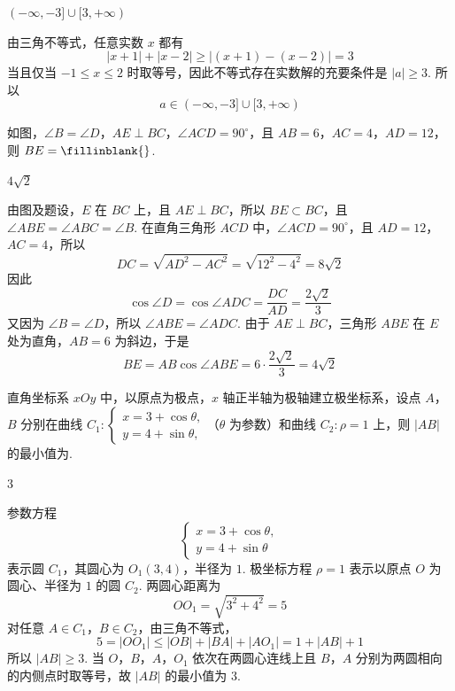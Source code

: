 \begin{answer}
\((-\infty,-3]\cup[3,+\infty)\)
\end{answer}

\begin{solution}
由三角不等式，任意实数 \(x\) 都有
\[
|x+1|+|x-2|\geqslant|(x+1)-(x-2)|=3
\]
当且仅当 \(-1\leqslant x\leqslant2\) 时取等号，因此不等式存在实数解的充要条件是 \(|a|\geqslant3\). 所以
\[
a\in(-\infty,-3]\cup[3,+\infty)
\]
\end{solution}

\begin{problem}
如图，\(\angle B = \angle D\)，\(AE \perp BC\)，\(\angle ACD = 90^{\circ}\)，且 \(AB = 6\)，\(AC = 4\)，\(AD = 12\)，则 \(BE =\fillinblank{}\).

\end{problem}

\begin{answer}
\(4\sqrt{2}\)
\end{answer}

\begin{solution}
由图及题设，\(E\) 在 \(BC\) 上，且 \(AE\perp BC\)，所以 \(BE\subset BC\)，且 \(\angle ABE=\angle ABC=\angle B\). 在直角三角形 \(ACD\) 中，\(\angle ACD=90^\circ\)，且 \(AD=12\)，\(AC=4\)，所以
\[
DC=\sqrt{AD^2-AC^2}=\sqrt{12^2-4^2}=8\sqrt{2}
\]
因此
\[
\cos\angle D=\cos\angle ADC=\frac{DC}{AD}=\frac{2\sqrt{2}}{3}
\]
又因为 \(\angle B=\angle D\)，所以 \(\angle ABE=\angle ADC\). 由于 \(AE\perp BC\)，三角形 \(ABE\) 在 \(E\) 处为直角，\(AB=6\) 为斜边，于是
\[
BE=AB\cos\angle ABE=6\cdot\frac{2\sqrt{2}}{3}=4\sqrt{2}
\]
\end{solution}

\begin{problem}
直角坐标系 \(xOy\) 中，以原点为极点，\(x\) 轴正半轴为极轴建立极坐标系，设点 \(A\)，\(B\) 分别在曲线 \( C_{1}:\begin{cases}
x=3+\cos\theta,\\
y=4+\sin\theta,
\end{cases} \)（\(\theta\) 为参数）和曲线 \( C_{2}:\rho=1 \) 上，则 \( |AB| \) 的最小值为\fillinblank{}.
\end{problem}

\begin{answer}
3
\end{answer}

\begin{solution}
参数方程
\[
\begin{cases}
x=3+\cos\theta,\\
y=4+\sin\theta
\end{cases}
\]
表示圆 \(C_1\)，其圆心为 \(O_1(3,4)\)，半径为 \(1\). 极坐标方程 \(\rho=1\) 表示以原点 \(O\) 为圆心、半径为 \(1\) 的圆 \(C_2\). 两圆心距离为
\[
OO_1=\sqrt{3^2+4^2}=5
\]
对任意 \(A\in C_1\)，\(B\in C_2\)，由三角不等式，
\[
5=|OO_1|\leqslant|OB|+|BA|+|AO_1|=1+|AB|+1
\]
所以 \(|AB|\geqslant3\). 当 \(O\)，\(B\)，\(A\)，\(O_1\) 依次在两圆心连线上且 \(B\)，\(A\) 分别为两圆相向的内侧点时取等号，故 \(|AB|\) 的最小值为 \(3\).
\end{solution}

